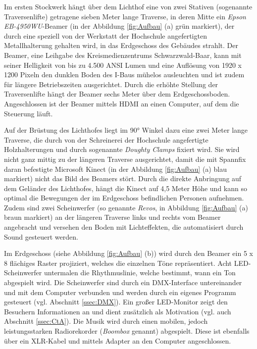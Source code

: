 Im ersten Stockwerk hängt über dem Lichthof eine von zwei Stativen (sogenannte Traversenlifte) getragene sieben Meter lange Traverse, in deren Mitte ein \emph{Epson EB-4950WU}-Beamer (in der Abbildung \ref{fig:Aufbau} (a) grün markiert), der durch eine speziell von der Werkstatt der Hochschule angefertigten Metallhalterung gehalten wird, in das Erdgeschoss des Gebäudes strahlt. Der Beamer, eine Leihgabe des Kreismedienzentrums Schwarzwald-Baar, kann mit seiner Helligkeit von bis zu 4.500 ANSI Lumen und eine Auflösung von 1920 x 1200 Pixeln den dunklen Boden des I-Baus mühelos ausleuchten und ist zudem für längere Betriebszeiten ausgerichtet. Durch die erhöhte Stellung der Traversenlifte hängt der Beamer sechs Meter über dem Erdgeschossboden. Angeschlossen ist der Beamer mittels HDMI an einen Computer, auf dem die Steuerung läuft.

Auf der Brüstung des Lichthofes liegt im 90° Winkel dazu eine zwei Meter lange Traverse, die durch von der Schreinerei der Hochschule angefertigte Holzhalterungen und durch sogenannte \emph{Doughty Clamps} fixiert wird. Sie wird nicht ganz mittig zu der längeren Traverse ausgerichtet, damit die mit Spannfix daran befestigte Microsoft Kinect (in der Abbildung \ref{fig:Aufbau} (a) blau markiert) nicht das Bild des Beamers stört. Durch die direkte Anbringung auf dem Geländer des Lichthofes, hängt die Kinect auf 4,5 Meter Höhe und kann so optimal die Bewegungen der im Erdgeschoss befindlichen Personen aufnehmen. Zudem sind zwei Scheinwerfer (so genannte \textit{Revos}, in Abbildung \ref{fig:Aufbau} (a) braun markiert) an der längeren Traverse links und rechts vom Beamer angebracht und versehen den Boden mit Lichteffekten, die automatisiert durch Sound gesteuert werden.

Im Erdgeschoss (siehe Abbildung \ref{fig:Aufbau} (b)) wird durch den Beamer ein 5 x 8 flächiges Raster projiziert, welches die einzelnen Töne repräsentiert. Acht LED-Scheinwerfer untermalen die Rhythmuslinie, welche bestimmt, wann ein Ton abgespielt wird. Die Scheinwerfer sind durch ein DMX-Interface untereinander und mit dem Computer verbunden und werden durch ein eigenes Programm gesteuert (vgl. Abschnitt \ref{ssec:DMX}). Ein großer LED-Monitor zeigt den Besuchern Informationen an und dient zusätzlich als Motivation (vgl. auch Abschnitt \ref{ssec:CtA}). Die Musik wird durch einen mobilen, jedoch leistungsstarken Radiorekorder (\textit{Boombox} genannt) abgespielt. Diese ist ebenfalls über ein XLR-Kabel und mittels Adapter an den Computer angeschlossen.